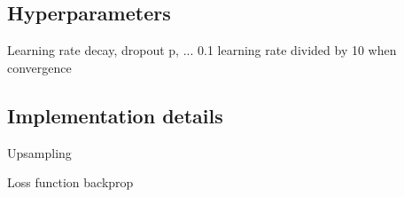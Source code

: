 \subsection{Hyperparameters}
Learning rate decay, dropout p, ...
0.1 learning rate divided by 10 when convergence

\subsection{Implementation details}
Upsampling

Loss function backprop
